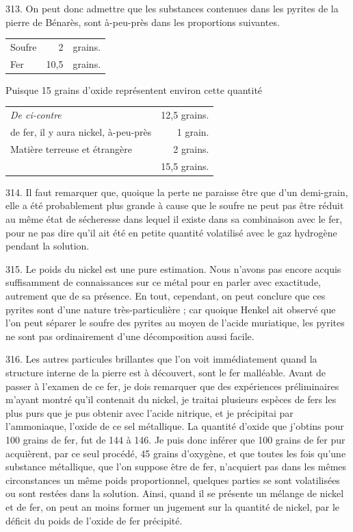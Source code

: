 \documentclass[a4paper, 11pt, oneside, polutonikogreek, french]{article}
\begin{document}
313. On peut donc admettre que les substances contenues dans les pyrites de la pierre de Bénarès, sont à-peu-près dans les proportions suivantes.

\begin{table}[!ht]
    \centering
    \bfseries
    \Fontauri
    \Large
    \begin{tabular}{l r l}
        Soufre & 2 & grains. \\
        Fer & 10,5 & grains. \\
    \end{tabular}
\end{table}

Puisque 15 grains d'oxide représentent environ cette quantité

\begin{table}[!ht]
    \centering
    \bfseries
    \Fontauri
    \Large
    \begin{tabular}{l r}
        \emph{De ci-contre} & 12,5 grains. \\
        de fer, il y aura nickel, à-peu-près & 1 grain. \\
        Matière terreuse et étrangère & 2 grains. \\ \hline
        ~ & 15,5 grains. \\
    \end{tabular}
\end{table}

314. Il faut remarquer que, quoique la perte ne paraisse être que d'un demi-grain, elle a été probablement plus grande à cause que le soufre ne peut pas être réduit au même état de sécheresse dans lequel il existe dans sa combinaison avec le fer, pour ne pas dire qu'il ait été en petite quantité volatilisé avec le gaz hydrogène pendant la solution.

315. Le poids du nickel est une pure estimation. Nous n'avons pas encore acquis suffisamment de connaissances sur ce métal pour en parler avec exactitude, autrement que de sa présence. En tout, cependant, on peut conclure que ces pyrites sont d'une nature très-particulière ; car quoique Henkel ait observé que l'on peut séparer le soufre des pyrites au moyen de l'acide muriatique, les pyrites ne sont pas ordinairement d'une décomposition aussi facile.

316. Les autres particules brillantes que l'on voit immédiatement quand la structure interne de la pierre est à découvert, sont le fer malléable. Avant de passer à l'examen de ce fer, je dois remarquer que des expériences préliminaires m'ayant montré qu'il contenait du nickel, je traitai plusieurs espèces de fers les plus purs que je pus obtenir avec l'acide nitrique, et je précipitai par l'ammoniaque, l'oxide de ce sel métallique. La quantité d'oxide que j'obtins pour 100 grains de fer, fut de 144 à 146. Je puis donc inférer que 100 grains de fer pur acquièrent, par ce seul procédé, 45 grains d'oxygène, et que toutes les fois qu'une substance métallique, que l'on suppose être de fer, n'acquiert pas dans les mêmes circonstances un même poids proportionnel, quelques parties se sont volatilisées ou sont restées dans la solution. Ainsi, quand il se présente un mélange de nickel et de fer, on peut an moins former un jugement sur la quantité de nickel, par le déficit du poids de l'oxide de fer précipité.
\end{document}
